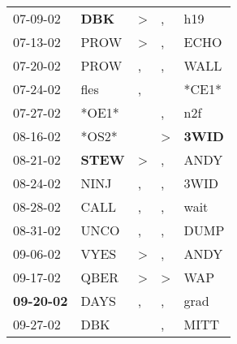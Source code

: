 \begin{supertabular}{p{0.07\textwidth}p{0.06\textwidth}p{0.02\textwidth}p{0.02\textwidth}p{0.06\textwidth}}
          07-09-02\textsuperscript{} &   \textbf{DBK\textsuperscript{}} &     \textgreater &                , &            h19\textsuperscript{} \\
          07-13-02\textsuperscript{} &           PROW\textsuperscript{} &     \textgreater &                , &           ECHO\textsuperscript{} \\
          07-20-02\textsuperscript{} &           PROW\textsuperscript{} &                , &                , &           WALL\textsuperscript{} \\
          07-24-02\textsuperscript{} &           fles\textsuperscript{} &                , &                  &                            *CE1* \\
          07-27-02\textsuperscript{} &                            *OE1* &                  &                , &            n2f\textsuperscript{} \\
          08-16-02\textsuperscript{} &                            *OS2* &                  &     \textgreater &  \textbf{3WID\textsuperscript{}} \\
          08-21-02\textsuperscript{} &  \textbf{STEW\textsuperscript{}} &     \textgreater &                , &           ANDY\textsuperscript{} \\
          08-24-02\textsuperscript{} &           NINJ\textsuperscript{} &                , &                , &           3WID\textsuperscript{} \\
          08-28-02\textsuperscript{} &           CALL\textsuperscript{} &                , &                , &           wait\textsuperscript{} \\
          08-31-02\textsuperscript{} &           UNCO\textsuperscript{} &                , &                , &           DUMP\textsuperscript{} \\
          09-06-02\textsuperscript{} &           VYES\textsuperscript{} &     \textgreater &                , &           ANDY\textsuperscript{} \\
          09-17-02\textsuperscript{} &           QBER\textsuperscript{} &     \textgreater &     \textgreater &            WAP\textsuperscript{} \\
 \textbf{09-20-02\textsuperscript{}} &           DAYS\textsuperscript{} &                , &                , &           grad\textsuperscript{} \\
          09-27-02\textsuperscript{} &            DBK\textsuperscript{} &                  &                , &           MITT\textsuperscript{} \\

\end{supertabular}
